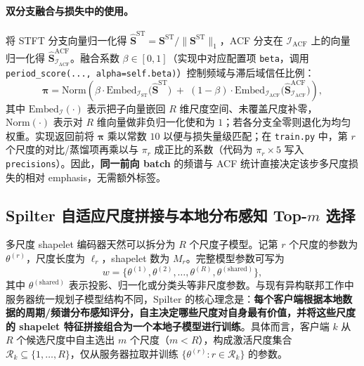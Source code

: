\documentclass{article}
\begin{document}
\paragraph{双分支融合与损失中的使用。}
将 STFT 分支向量归一化得 $\hat{\mathbf{S}}^{\mathrm{ST}}=\mathbf{S}^{\mathrm{ST}}/\|\mathbf{S}^{\mathrm{ST}}\|_1$，ACF 分支在 $\mathcal{I}_{\mathrm{ACF}}$ 上的向量归一化得 $\hat{\mathbf{S}}^{\mathrm{ACF}}_{\mathcal{I}_{\mathrm{ACF}}}$。融合系数 $\beta\in[0,1]$（实现中对应配置项 \texttt{beta}，调用 \texttt{period\_score(..., alpha=self.beta)}）控制频域与滞后域信任比例：
\begin{equation}
\bm{\pi}=\mathrm{Norm}\!\left(
\beta\cdot \mathrm{Embed}_{\mathcal{I}_{\mathrm{ST}}}\!\bigl(\hat{\mathbf{S}}^{\mathrm{ST}}\bigr)
\;+\;
(1-\beta)\cdot \mathrm{Embed}_{\mathcal{I}_{\mathrm{ACF}}}\!\bigl(\hat{\mathbf{S}}^{\mathrm{ACF}}_{\mathcal{I}_{\mathrm{ACF}}}\bigr)
\right),
\label{eq:period-fuse}
\end{equation}
其中 $\mathrm{Embed}_{\mathcal{I}}(\cdot)$ 表示把子向量嵌回 $R$ 维尺度空间、未覆盖尺度补零，$\mathrm{Norm}(\cdot)$ 表示对 $R$ 维向量做非负归一化使和为 $1$；若各分支全零则退化为均匀权重。实现返回前将 $\bm{\pi}$ 乘以常数 $10$ 以便与损失量级匹配；在 \texttt{train.py} 中，第 $r$ 个尺度的对比/蒸馏项再乘以与 $\pi_r$ 成正比的系数（代码为 $\pi_r\times 5$ 写入 \texttt{precisions}）。因此，\textbf{同一前向 batch} 的频谱与 ACF 统计直接决定该步多尺度损失的相对 emphasis，无需额外标签。

\subsection{Spilter 自适应尺度拼接与本地分布感知 Top-$m$ 选择}
\label{sec:spilter}

多尺度 shapelet 编码器天然可以拆分为 $R$ 个尺度子模型。记第 $r$ 个尺度的参数为 $\theta^{(r)}$，尺度长度为 $\ell_r$，shapelet 数为 $M_r$。完整模型参数可写为
\begin{equation}
w=\{\theta^{(1)},\theta^{(2)},\ldots,\theta^{(R)},\theta^{(\mathrm{shared})}\},
\end{equation}
其中 $\theta^{(\mathrm{shared})}$ 表示投影、归一化或分类头等非尺度参数。与现有异构联邦工作中服务器统一规划子模型结构不同，Spilter 的核心理念是：\textbf{每个客户端根据本地数据的周期/频谱分布感知评分，自主决定哪些尺度对自身最有价值，并将这些尺度的 shapelet 特征拼接组合为一个本地子模型进行训练}。具体而言，客户端 $k$ 从 $R$ 个候选尺度中自主选出 $m$ 个尺度（$m<R$），构成激活尺度集合 $\mathcal{R}_k\subseteq\{1,\ldots,R\}$，仅从服务器拉取并训练 $\{\theta^{(r)}:r\in\mathcal{R}_k\}$ 的参数。
\end{document}
